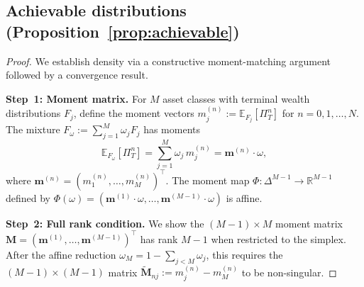 \documentclass[11pt,a4paper]{article}
\numberwithin{equation}{section}
\newcommand{\E}{\mathbb{E}}
\newcommand{\R}{\mathbb{R}}
\begin{document}
\begin{appendices}
\subsection{Achievable distributions (Proposition~\ref{prop:achievable})}\label{app:density_proof}

\begin{proof}
We establish density via a constructive moment-matching argument followed by a convergence result.

\medskip\noindent\textbf{Step~1: Moment matrix.}
For $M$ asset classes with terminal wealth distributions $F_j$, define the moment vectors $m^{(n)}_j := \E_{F_j}[\Pi_T^n]$ for $n = 0, 1, \ldots, N$.  The mixture $F_\omega := \sum_{j=1}^M \omega_j F_j$ has moments
\begin{equation}\label{eq:mixture_moments}
\E_{F_\omega}[\Pi_T^n] = \sum_{j=1}^M \omega_j\, m^{(n)}_j = \bm{m}^{(n)} \cdot \omega,
\end{equation}
where $\bm{m}^{(n)} = (m^{(n)}_1, \ldots, m^{(n)}_M)^\top$.  The moment map $\Phi : \Delta^{M-1} \to \R^{M-1}$ defined by $\Phi(\omega) = (\bm{m}^{(1)} \cdot \omega, \ldots, \bm{m}^{(M-1)} \cdot \omega)$ is affine.

\medskip\noindent\textbf{Step~2: Full rank condition.}
We show the $(M-1) \times M$ moment matrix $\mathbf{M} = (\bm{m}^{(1)}, \ldots, \bm{m}^{(M-1)})^\top$ has rank $M-1$ when restricted to the simplex.  After the affine reduction $\omega_M = 1 - \sum_{j<M} \omega_j$, this requires the $(M-1) \times (M-1)$ matrix $\tilde{\mathbf{M}}_{nj} := m^{(n)}_j - m^{(n)}_M$ to be non-singular.


\end{proof}
\end{appendices}
\end{document}
